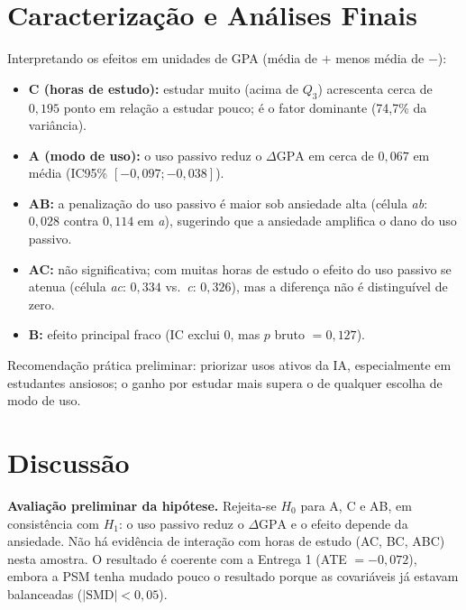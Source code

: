 \documentclass[12pt,a4paper]{article}
\newcommand{\dgpa}{\ensuremath{\Delta\mathrm{GPA}}}
\begin{document}
\section{Caracteriza\c{c}\~ao e An\'alises Finais}
Interpretando os efeitos em unidades de GPA (m\'edia de $+$ menos m\'edia de $-$):
\begin{itemize}
\item \textbf{C (horas de estudo):} estudar muito (acima de $Q_3$) acrescenta cerca de $0{,}195$ ponto em relação a estudar pouco; \'e o fator dominante (74,7\% da variância).
\item \textbf{A (modo de uso):} o uso passivo reduz o \dgpa{} em cerca de $0{,}067$ em m\'edia (IC95\% $[-0{,}097;-0{,}038]$).
\item \textbf{AB:} a penaliza\c{c}\~ao do uso passivo \'e maior sob ansiedade alta (c\'elula \emph{ab}: $0{,}028$ contra $0{,}114$ em \emph{a}), sugerindo que a ansiedade amplifica o dano do uso passivo.
\item \textbf{AC:} n\~ao significativa; com muitas horas de estudo o efeito do uso passivo se atenua (c\'elula \emph{ac}: $0{,}334$ vs.\ \emph{c}: $0{,}326$), mas a diferen\c{c}a n\~ao \'e distingu\'ivel de zero.
\item \textbf{B:} efeito principal fraco (IC exclui 0, mas $p$ bruto $=0{,}127$).
\end{itemize}
Recomenda\c{c}\~ao pr\'atica preliminar: priorizar usos ativos da IA, especialmente em estudantes ansiosos; o ganho por estudar mais supera o de qualquer escolha de modo de uso.

\section{Discuss\~ao}
\textbf{Avalia\c{c}\~ao preliminar da hip\'otese.} Rejeita-se $H_0$ para A, C e AB, em consist\^encia com $H_1$: o uso passivo
reduz o \dgpa{} e o efeito depende da ansiedade. N\~ao h\'a evid\^encia de intera\c{c}\~ao com horas de estudo (AC, BC, ABC) nesta amostra.
O resultado \'e coerente com a Entrega 1 (ATE $=-0{,}072$), embora a PSM tenha mudado pouco o resultado porque as covari\'aveis j\'a estavam balanceadas ($|\text{SMD}|<0{,}05$).
\end{document}
